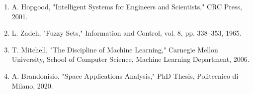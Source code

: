 \documentclass[a4paper, 11pt]{article}
\begin{document}
\begin{enumerate}
    \item A. Hopgood, "Intelligent Systems for Engineers and Scientists," CRC Press, 2001.

    \item L. Zadeh, "Fuzzy Sets," Information and Control, vol. 8, pp. 338–353, 1965.

    \item T. Mitchell, "The Discipline of Machine Learning," Carnegie Mellon University, School of Computer Science, Machine Learning Department, 2006.

    \item A. Brandonisio, "Space Applications Analysis," PhD Thesis, Politecnico di Milano, 2020.
\end{enumerate}
\end{document}
